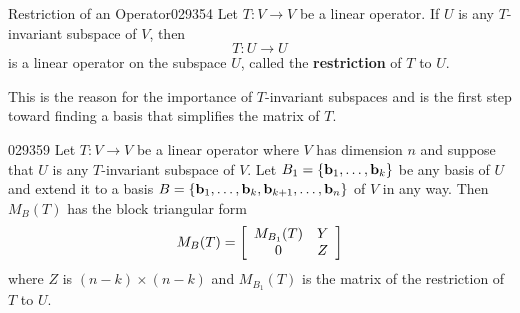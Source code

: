 \begin{definition}{Restriction of an Operator}{029354}
Let $T : V \to V$ be a linear operator. If $U$ is any $T$-invariant subspace of $V$, then
\begin{equation*}
T : U \to U
\end{equation*}
is a linear operator on the subspace $U$, called the \textbf{restriction} of $T$ to $U$.
\end{definition}

\noindent This is the reason for the importance of $T$-invariant subspaces and is the first step toward finding a basis that simplifies the matrix of $T$.


\begin{theorem}{}{029359}
Let $T : V \to V$ be a linear operator where $V$ has dimension $n$ and suppose that $U$ is any $T$-invariant subspace of $V$. Let $B_{1} = \{\textbf{b}_{1}, \dots, \textbf{b}_{k}\}$ be any basis of $U$ and extend it to a basis $B = \{\textbf{b}_{1}, \dots, \textbf{b}_{k}, \textbf{b}_{k+1}, \dots, \textbf{b}_{n}\}$ of $V$ in any way. Then $M_{B}(T)$ has the block triangular form
\begin{equation*}
M_B(T) = \left[ \begin{array}{cc} M_{B_1}(T) & Y \\ 0 & Z \end{array} \right]
\end{equation*}
where $Z$ is $(n - k) \times (n - k)$ and $M_{B_1}(T)$ is the matrix of the restriction of $T$ to $U$.
\end{theorem}

